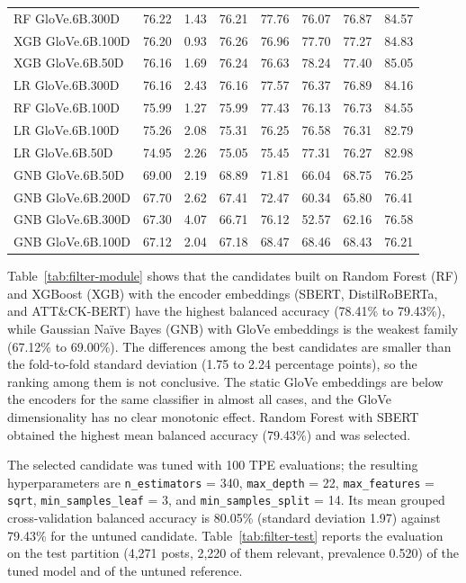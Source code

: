 \begin{table}
\begin{tabular}{lrrrrrrr}
        RF GloVe.6B.300D & 76.22 & 1.43 & 76.21 & 77.76 & 76.07 & 76.87 & 84.57 \\
        XGB GloVe.6B.100D & 76.20 & 0.93 & 76.26 & 76.96 & 77.70 & 77.27 & 84.83 \\
        XGB GloVe.6B.50D & 76.16 & 1.69 & 76.24 & 76.63 & 78.24 & 77.40 & 85.05 \\
        LR GloVe.6B.300D & 76.16 & 2.43 & 76.16 & 77.57 & 76.37 & 76.89 & 84.16 \\
        RF GloVe.6B.100D & 75.99 & 1.27 & 75.99 & 77.43 & 76.13 & 76.73 & 84.55 \\
        LR GloVe.6B.100D & 75.26 & 2.08 & 75.31 & 76.25 & 76.58 & 76.31 & 82.79 \\
        LR GloVe.6B.50D & 74.95 & 2.26 & 75.05 & 75.45 & 77.31 & 76.27 & 82.98 \\
        GNB GloVe.6B.50D & 69.00 & 2.19 & 68.89 & 71.81 & 66.04 & 68.75 & 76.25 \\
        GNB GloVe.6B.200D & 67.70 & 2.62 & 67.41 & 72.47 & 60.34 & 65.80 & 76.41 \\
        GNB GloVe.6B.300D & 67.30 & 4.07 & 66.71 & 76.12 & 52.57 & 62.16 & 76.58 \\
        GNB GloVe.6B.100D & 67.12 & 2.04 & 67.18 & 68.47 & 68.46 & 68.43 & 76.21 \\
        \hline
    \end{tabular}
\end{table}

Table~\ref{tab:filter-module} shows that the candidates built on Random Forest (RF) and XGBoost (XGB) with the encoder embeddings (SBERT, DistilRoBERTa, and ATT{\&}CK-BERT) have the highest balanced accuracy (78.41{\%} to 79.43{\%}), while Gaussian Naïve Bayes (GNB) with GloVe embeddings is the weakest family (67.12{\%} to 69.00{\%}). The differences among the best candidates are smaller than the fold-to-fold standard deviation (1.75 to 2.24 percentage points), so the ranking among them is not conclusive. The static GloVe embeddings are below the encoders for the same classifier in almost all cases, and the GloVe dimensionality has no clear monotonic effect. Random Forest with SBERT obtained the highest mean balanced accuracy (79.43{\%}) and was selected.

The selected candidate was tuned with 100 TPE evaluations; the resulting hyperparameters are \texttt{n\_estimators} = 340, \texttt{max\_depth} = 22, \texttt{max\_features} = \texttt{sqrt}, \texttt{min\_samples\_leaf} = 3, and \texttt{min\_samples\_split} = 14. Its mean grouped cross-validation balanced accuracy is 80.05{\%} (standard deviation 1.97) against 79.43{\%} for the untuned candidate. Table~\ref{tab:filter-test} reports the evaluation on the test partition (4,271 posts, 2,220 of them relevant, prevalence 0.520) of the tuned model and of the untuned reference.

